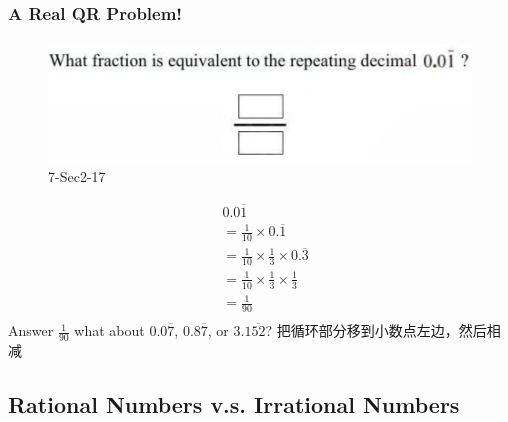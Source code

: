 \documentclass[
	11pt, %
	handout,
]{beamer}
\begin{document}
\begin{frame}
	\frametitle{A Real QR Problem!}
	\framesubtitle{}
	\begin{figure}
		\includegraphics[width=0.6\linewidth]{Decimal_Example_Question1.png}
		\caption{7-Sec2-17}
	\end{figure}
	\pause
\begin{equation*}
	\begin{aligned}
	&0.0\overline{1}  \\
	& =\frac{1}{10} \times 0.\overline{1} \\
	& =\frac{1}{10} \times  \frac{1}{3} \times 0.\overline{3} \\
	& =\frac{1}{10} \times  \frac{1}{3} \times \frac{1}{3} \\
	& = \frac{1}{90}\\
	\end{aligned}
\end{equation*}
\pause
\bigskip
Answer \textbf{$\frac{1}{90}$} \quad what about $0.0\overline{7}$, $0.8\overline{7}$, or $3.1\overline{52}$? \pause 把循环部分移到小数点左边，然后相减
\end{frame}


\subsection{Rational Numbers v.s. Irrational Numbers}

\end{document}
